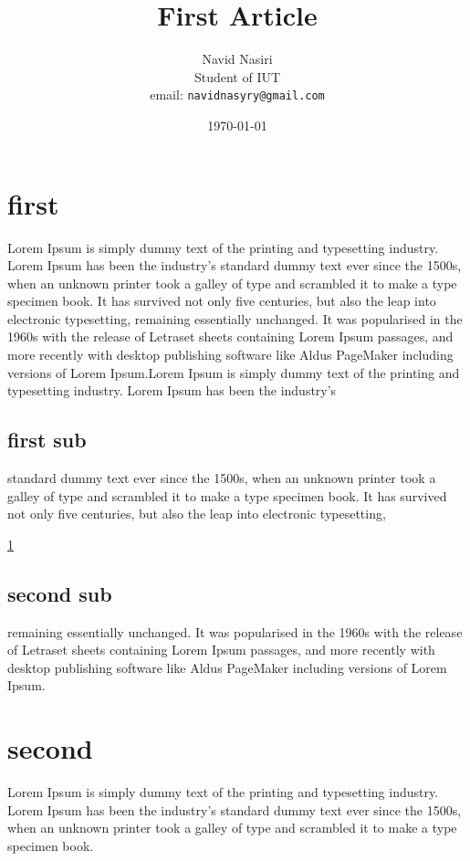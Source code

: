 \documentclass[11pt, a4paper]{article}
\title{	First Article}
\author{Navid Nasiri \\
	Student of IUT \\
	email: \texttt{navidnasyry@gmail.com}
}
\date{\today}
\begin{document}
\begin{title}
	
	\maketitle

\end{title}

\newpage


\maketitle

\section{first} \label{section.intro}
Lorem Ipsum is simply dummy text of the printing and typesetting industry. Lorem Ipsum has been the industry's standard dummy text ever since the 1500s, when an unknown printer took a galley of type and scrambled it to make a type specimen book. It has survived not only five centuries, but also the leap into electronic typesetting, remaining essentially unchanged. It was popularised in the 1960s with the release of Letraset sheets containing Lorem Ipsum passages, and more recently with desktop publishing software like Aldus PageMaker including versions of Lorem Ipsum.Lorem Ipsum is simply dummy text of the printing and typesetting industry. Lorem Ipsum has been the industry's

\subsection{first sub}
 standard dummy text ever since the 1500s, when an unknown printer took a galley of type and scrambled it to make a type specimen book. It has survived not only five centuries, but also the leap into electronic typesetting,
 
 \ref{section.intro}
 
 \subsection{second sub}
 
  remaining essentially unchanged. It was popularised in the 1960s with the release of Letraset sheets containing Lorem Ipsum passages, and more recently with desktop publishing software like Aldus PageMaker including versions of Lorem Ipsum.
\section{second}
Lorem Ipsum is simply dummy text of the printing and typesetting industry. Lorem Ipsum has been the industry's standard dummy text ever since the 1500s, when an unknown printer took a galley of type and scrambled it to make a type specimen book.
\end{document}
